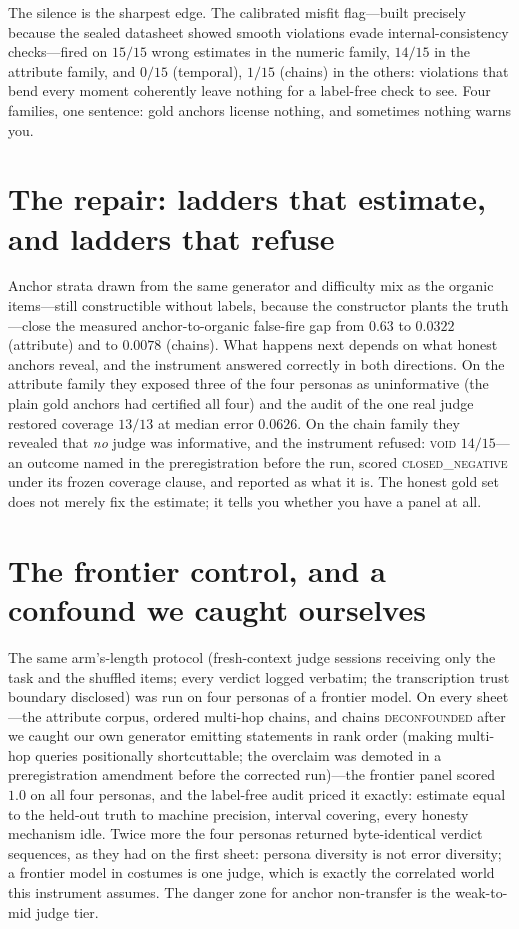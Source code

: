 \documentclass[11pt]{article}
\begin{document}
The silence is the sharpest edge. The calibrated misfit flag---built precisely because the sealed
datasheet showed smooth violations evade internal-consistency checks---fired on $15/15$ wrong
estimates in the numeric family, $14/15$ in the attribute family, and $0/15$ (temporal), $1/15$
(chains) in the others: violations that bend every moment coherently leave nothing for a label-free
check to see. Four families, one sentence: gold anchors license nothing, and sometimes nothing warns
you.

\section{The repair: ladders that estimate, and ladders that refuse}

Anchor strata drawn from the same generator and difficulty mix as the organic items---still
constructible without labels, because the constructor plants the truth---close the measured
anchor-to-organic false-fire gap from $0.63$ to $0.0322$ (attribute) and to $0.0078$ (chains). What
happens next depends on what honest anchors reveal, and the instrument answered correctly in both
directions. On the attribute family they exposed three of the four personas as uninformative (the
plain gold anchors had certified all four) and the audit of the one real judge restored coverage
$13/13$ at median error $0.0626$. On the chain family they revealed that \emph{no} judge was
informative, and the instrument refused: \textsc{void} $14/15$---an outcome named in the
preregistration before the run, scored \textsc{closed\_negative} under its frozen coverage clause, and
reported as what it is. The honest gold set does not merely fix the estimate; it tells you whether you
have a panel at all.

\section{The frontier control, and a confound we caught ourselves}

The same arm's-length protocol (fresh-context judge sessions receiving only the task and the shuffled
items; every verdict logged verbatim; the transcription trust boundary disclosed) was run on four
personas of a frontier model. On every sheet---the attribute corpus, ordered multi-hop chains, and
chains \textsc{deconfounded} after we caught our own generator emitting statements in rank order
(making multi-hop queries positionally shortcuttable; the overclaim was demoted in a preregistration
amendment before the corrected run)---the frontier panel scored $1.0$ on all four personas, and the
label-free audit priced it exactly: estimate equal to the held-out truth to machine precision,
interval covering, every honesty mechanism idle. Twice more the four personas returned byte-identical
verdict sequences, as they had on the first sheet: persona diversity is not error diversity; a
frontier model in costumes is one judge, which is exactly the correlated world this instrument
assumes. The danger zone for anchor non-transfer is the weak-to-mid judge tier.
\end{document}
